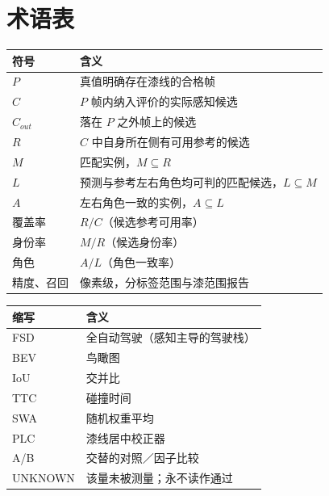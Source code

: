 \documentclass[journal]{IEEEtran}
\begin{document}
\section*{术语表}
\begin{table}[!t]
\centering
\begin{tabular}{@{}ll@{}}
\toprule
符号 & 含义 \\
\midrule
$P$ & 真值明确存在漆线的合格帧 \\
$C$ & $P$ 帧内纳入评价的实际感知候选 \\
$C_{out}$ & 落在 $P$ 之外帧上的候选 \\
$R$ & $C$ 中自身所在侧有可用参考的候选 \\
$M$ & 匹配实例，$M \subseteq R$ \\
$L$ & 预测与参考左右角色均可判的匹配候选，$L \subseteq M$ \\
$A$ & 左右角色一致的实例，$A \subseteq L$ \\
覆盖率 & $R/C$（候选参考可用率） \\
身份率 & $M/R$（候选身份率） \\
角色 & $A/L$（角色一致率） \\
精度、召回 & 像素级，分标签范围与漆范围报告 \\
\bottomrule
\end{tabular}
\end{table}
\begin{table}[!t]
\centering
\begin{tabular}{@{}ll@{}}
\toprule
缩写 & 含义 \\
\midrule
FSD & 全自动驾驶（感知主导的驾驶栈） \\
BEV & 鸟瞰图 \\
IoU & 交并比 \\
TTC & 碰撞时间 \\
SWA & 随机权重平均 \\
PLC & 漆线居中校正器 \\
A/B & 交替的对照／因子比较 \\
UNKNOWN & 该量未被测量；永不读作通过 \\
\bottomrule
\end{tabular}
\end{table}
\end{document}
